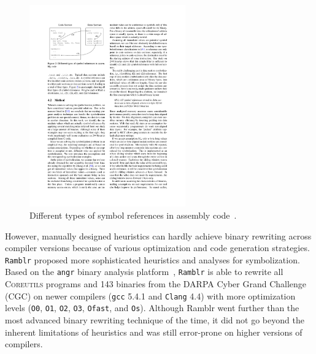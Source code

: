 \begin{figure}[tb]
  \centering
  \includegraphics[width=0.6\textwidth]{fig/uroboros.pdf}
  \caption{Different types of symbol references in assembly code~\cite{wang2015reassembleable}.}
  \label{fig:uroboros}
\end{figure}

However, manually designed heuristics can hardly achieve binary rewriting across compiler versions because of various optimization and code generation strategies.
\texttt{Ramblr} proposed more sophisticated heuristics and analyses for symbolization. Based on the \texttt{angr} binary analysis platform~\cite{shoshitaishvili2016sok}, \texttt{Ramblr} is able to rewrite all \textsc{Coreutils} programs and 143 binaries from the DARPA Cyber Grand Challenge (CGC) on newer compilers (\texttt{gcc} 5.4.1 and \texttt{Clang} 4.4) with more optimization levels (\texttt{O0}, \texttt{O1}, \texttt{O2}, \texttt{O3}, \texttt{Ofast}, and \texttt{Os}). Although Ramblr went further than the most advanced binary rewriting technique of the time, it did not go beyond the inherent limitations of heuristics and was still error-prone on higher versions of compilers.

